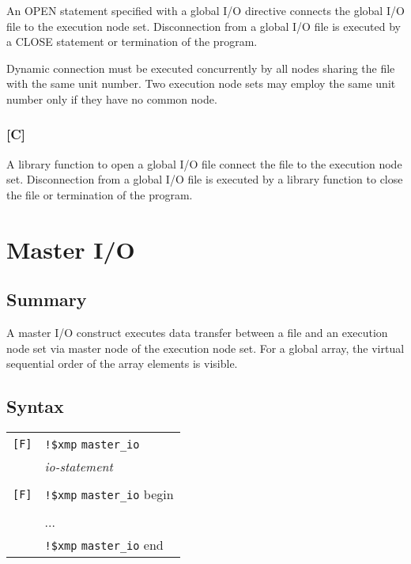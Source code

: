   An OPEN statement specified with a global I/O directive connects the
  global I/O file to the execution node set.
  Disconnection from a global I/O file is executed by a CLOSE statement
  or termination of the program.

  Dynamic connection must be executed concurrently by all nodes sharing
  the file with the same unit number.
  Two execution node sets may employ the same unit number only if they
  have no common node.

  \subsubsection*{[C]}

  A library function to open a global I/O file connect the file to the
  execution node set.
  Disconnection from a global I/O file is executed by a library function
  to close the file or termination of the program.

  \section{Master I/O}

  \subsection*{Summary}
  A master I/O construct executes data transfer between a file and an
  execution node set via master node of the execution node set.
  For a global array, the virtual sequential order of the array elements
  is visible.

  \subsection*{Syntax}

  \begin{tabular}{ll}
   \verb![F]! & \verb|!$xmp| {\tt \verb|master_io|} \\
   & \hspace{5mm} {\it io-statement} \\
   & \\
   \verb![F]! & \verb|!$xmp| {\tt \verb|master_io|} begin \\
   & \hspace{5mm}{\it io-statement} \\
   & \hspace{5mm}... \\
   & \verb|!$xmp| {\tt \verb|master_io|} end \\
  \end{tabular}

